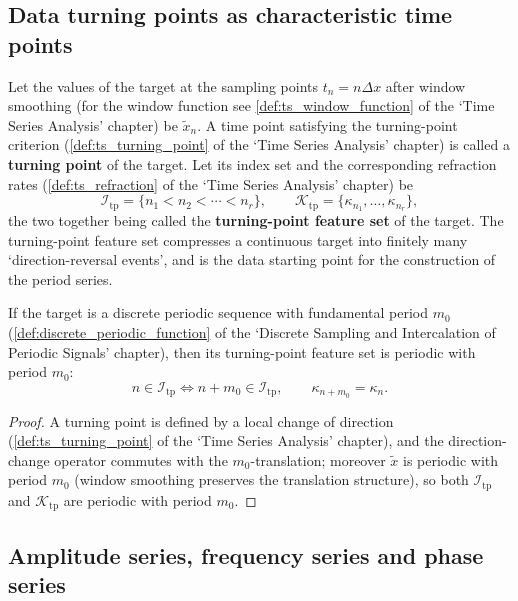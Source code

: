 \subsection{Data turning points as characteristic time points}

\begin{definition}\label{def:ps_inflection_features}
Let the values of the target at the sampling points $t_n=n\Delta x$ after window smoothing (for the window function see \cref{def:ts_window_function} of the `Time Series Analysis' chapter) be $\tilde{x}_n$. A time point satisfying the turning-point criterion (\cref{def:ts_turning_point} of the `Time Series Analysis' chapter) is called a \textbf{turning point} of the target. Let its index set and the corresponding refraction rates (\cref{def:ts_refraction} of the `Time Series Analysis' chapter) be
\[
\mathcal{I}_{\mathrm{tp}}=\{n_1<n_2<\cdots<n_r\},\qquad
\mathcal{K}_{\mathrm{tp}}=\{\kappa_{n_1},\dots,\kappa_{n_r}\},
\]
the two together being called the \textbf{turning-point feature set} of the target. The turning-point feature set compresses a continuous target into finitely many `direction-reversal events', and is the data starting point for the construction of the period series.
\end{definition}

\begin{proposition}\label{prop:ps_inflection_carries_period}
If the target is a discrete periodic sequence with fundamental period $m_0$ (\cref{def:discrete_periodic_function} of the `Discrete Sampling and Intercalation of Periodic Signals' chapter), then its turning-point feature set is periodic with period $m_0$:
\[
n\in\mathcal{I}_{\mathrm{tp}}\iff n+m_0\in\mathcal{I}_{\mathrm{tp}},
\qquad
\kappa_{n+m_0}=\kappa_n .
\]
\end{proposition}

\begin{proof}
A turning point is defined by a local change of direction (\cref{def:ts_turning_point} of the `Time Series Analysis' chapter), and the direction-change operator commutes with the $m_0$-translation; moreover $\tilde{x}$ is periodic with period $m_0$ (window smoothing preserves the translation structure), so both $\mathcal{I}_{\mathrm{tp}}$ and $\mathcal{K}_{\mathrm{tp}}$ are periodic with period $m_0$.
\end{proof}

\subsection{Amplitude series, frequency series and phase series}

